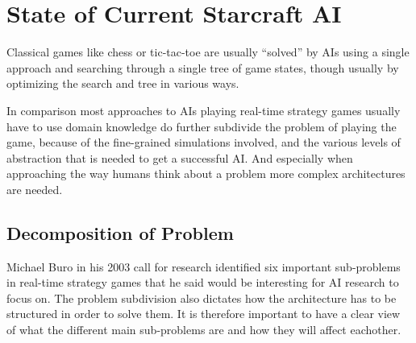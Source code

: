 
\section{State of Current Starcraft AI}
Classical games like chess or tic-tac-toe are usually ``solved'' by AIs using a
single approach and searching through a single tree of game states, though
usually by optimizing the search and tree in various ways.

In comparison most approaches to AIs playing real-time strategy games usually
have to use domain knowledge do further subdivide the problem of playing the
game, because of the fine-grained simulations involved, and the various levels
of abstraction that is needed to get a successful AI. And especially when
approaching the way humans think about a problem more complex architectures
are needed.

\subsection{Decomposition of Problem}
Michael Buro in his 2003 call for research \cite{buro2003real} identified six
important sub-problems in real-time strategy games that he said would be
interesting for AI research to focus on. The problem subdivision also dictates
how the architecture has to be structured in order to solve them. It is
therefore important to have a clear view of what the different main sub-problems
are and how they will affect eachother.

